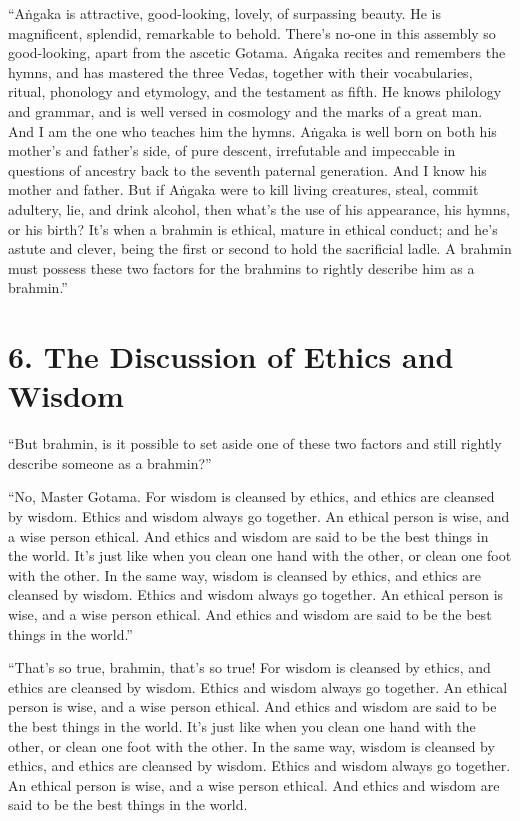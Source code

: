 \documentclass[12pt,openany]{book}%
\begin{document}
“\textsanskrit{Aṅgaka} is attractive, good-looking, lovely, of surpassing beauty. He is magnificent, splendid, remarkable to behold. There’s no-one in this assembly so good-looking, apart from the ascetic Gotama. \textsanskrit{Aṅgaka} recites and remembers the hymns, and has mastered the three Vedas, together with their vocabularies, ritual, phonology and etymology, and the testament as fifth. He knows philology and grammar, and is well versed in cosmology and the marks of a great man. And I am the one who teaches him the hymns. \textsanskrit{Aṅgaka} is well born on both his mother’s and father’s side, of pure descent, irrefutable and impeccable in questions of ancestry back to the seventh paternal generation. And I know his mother and father. But if \textsanskrit{Aṅgaka} were to kill living creatures, steal, commit adultery, lie, and drink alcohol, then what’s the use of his appearance, his hymns, or his birth? It’s when a brahmin is ethical, mature in ethical conduct; and he’s astute and clever, being the first or second to hold the sacrificial ladle. A brahmin must possess these two factors for the brahmins to rightly describe him as a brahmin.” 

\section*{6. The Discussion of Ethics and Wisdom }

“But brahmin, is it possible to set aside one of these two factors and still rightly describe someone as a brahmin?” 

“No, Master Gotama. For wisdom is cleansed by ethics, and ethics are cleansed by wisdom. Ethics and wisdom always go together. An ethical person is wise, and a wise person ethical. And ethics and wisdom are said to be the best things in the world. It’s just like when you clean one hand with the other, or clean one foot with the other. In the same way, wisdom is cleansed by ethics, and ethics are cleansed by wisdom. Ethics and wisdom always go together. An ethical person is wise, and a wise person ethical. And ethics and wisdom are said to be the best things in the world.” 

“That’s so true, brahmin, that’s so true! For wisdom is cleansed by ethics, and ethics are cleansed by wisdom. Ethics and wisdom always go together. An ethical person is wise, and a wise person ethical. And ethics and wisdom are said to be the best things in the world. It’s just like when you clean one hand with the other, or clean one foot with the other. In the same way, wisdom is cleansed by ethics, and ethics are cleansed by wisdom. Ethics and wisdom always go together. An ethical person is wise, and a wise person ethical. And ethics and wisdom are said to be the best things in the world. 
\end{document}
